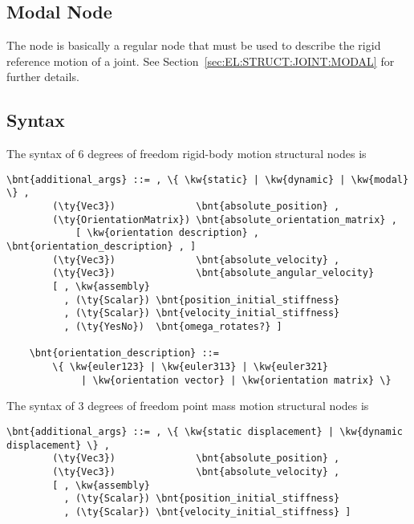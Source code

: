 \subsection{Modal Node}
\label{sec:NODE:STRUCTURAL:MODAL}
The  node is basically a regular  node
that must be used to describe the rigid reference motion
of a  joint.
See Section~\ref{sec:EL:STRUCT:JOINT:MODAL} for further details.

\subsection{Syntax}
\label{sec:NODE:STRUCTURAL:SYNTAX}
The syntax of 6 degrees of freedom rigid-body motion structural nodes is
\begin{Verbatim}[commandchars=\\\{\}]
    \bnt{additional_args} ::= , \{ \kw{static} | \kw{dynamic} | \kw{modal} \} ,
        (\ty{Vec3})              \bnt{absolute_position} ,
        (\ty{OrientationMatrix}) \bnt{absolute_orientation_matrix} ,
            [ \kw{orientation description} , \bnt{orientation_description} , ]
        (\ty{Vec3})              \bnt{absolute_velocity} ,
        (\ty{Vec3})              \bnt{absolute_angular_velocity}
        [ , \kw{assembly}
          , (\ty{Scalar}) \bnt{position_initial_stiffness}
          , (\ty{Scalar}) \bnt{velocity_initial_stiffness}
          , (\ty{YesNo})  \bnt{omega_rotates?} ]

    \bnt{orientation_description} ::=
        \{ \kw{euler123} | \kw{euler313} | \kw{euler321}
             | \kw{orientation vector} | \kw{orientation matrix} \}
\end{Verbatim}

The syntax of 3 degrees of freedom point mass motion structural nodes is
\begin{Verbatim}[commandchars=\\\{\}]
    \bnt{additional_args} ::= , \{ \kw{static displacement} | \kw{dynamic displacement} \} ,
        (\ty{Vec3})              \bnt{absolute_position} ,
        (\ty{Vec3})              \bnt{absolute_velocity} ,
        [ , \kw{assembly}
          , (\ty{Scalar}) \bnt{position_initial_stiffness}
          , (\ty{Scalar}) \bnt{velocity_initial_stiffness} ]
\end{Verbatim}

